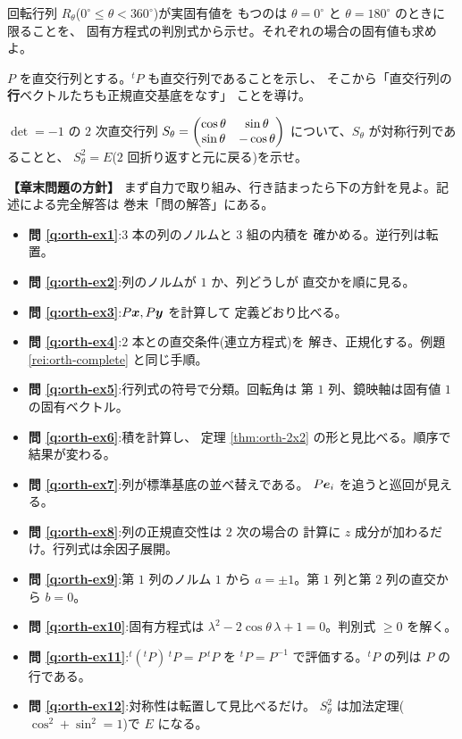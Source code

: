 \begin{mondai}[発展]\label{q:orth-ex10}
回転行列 $R_\theta$($0^\circ \le \theta < 360^\circ$)が実固有値を
もつのは $\theta = 0^\circ$ と $\theta = 180^\circ$ のときに限ることを、
固有方程式の判別式から示せ。それぞれの場合の固有値も求めよ。
\end{mondai}

\begin{mondai}[証明]\label{q:orth-ex11}
$P$ を直交行列とする。${}^t\!P$ も直交行列であることを示し、
そこから「直交行列の\textbf{行}ベクトルたちも正規直交基底をなす」
ことを導け。
\end{mondai}

\begin{mondai}[証明]\label{q:orth-ex12}
$\det = -1$ の $2$ 次直交行列
$S_\theta = \begin{pmatrix}\cos\theta & \sin\theta \\ \sin\theta & -\cos\theta\end{pmatrix}$
について、$S_\theta$ が対称行列であることと、
$S_\theta^2 = E$($2$ 回折り返すと元に戻る)を示せ。
\end{mondai}

\bigskip
{\small
\noindent\textbf{【章末問題の方針】}\quad
まず自力で取り組み、行き詰まったら下の方針を見よ。記述による完全解答は
巻末「問の解答」にある。
\begin{itemize}
\item \textbf{問 \ref{q:orth-ex1}}:$3$ 本の列のノルムと $3$ 組の内積を
確かめる。逆行列は転置。
\item \textbf{問 \ref{q:orth-ex2}}:列のノルムが $1$ か、列どうしが
直交かを順に見る。
\item \textbf{問 \ref{q:orth-ex3}}:$P\bm{x}, P\bm{y}$ を計算して
定義どおり比べる。
\item \textbf{問 \ref{q:orth-ex4}}:$2$ 本との直交条件(連立方程式)を
解き、正規化する。例題 \ref{rei:orth-complete} と同じ手順。
\item \textbf{問 \ref{q:orth-ex5}}:行列式の符号で分類。回転角は
第 $1$ 列、鏡映軸は固有値 $1$ の固有ベクトル。
\item \textbf{問 \ref{q:orth-ex6}}:積を計算し、
定理 \ref{thm:orth-2x2} の形と見比べる。順序で結果が変わる。
\item \textbf{問 \ref{q:orth-ex7}}:列が標準基底の並べ替えである。
$P\bm{e}_i$ を追うと巡回が見える。
\item \textbf{問 \ref{q:orth-ex8}}:列の正規直交性は $2$ 次の場合の
計算に $z$ 成分が加わるだけ。行列式は余因子展開。
\item \textbf{問 \ref{q:orth-ex9}}:第 $1$ 列のノルム $1$ から
$a = \pm 1$。第 $1$ 列と第 $2$ 列の直交から $b = 0$。
\item \textbf{問 \ref{q:orth-ex10}}:固有方程式は
$\lambda^2 - 2\cos\theta\,\lambda + 1 = 0$。判別式 $\ge 0$ を解く。
\item \textbf{問 \ref{q:orth-ex11}}:${}^t({}^t\!P)\,{}^t\!P = P\,{}^t\!P$
を ${}^t\!P = P^{-1}$ で評価する。${}^t\!P$ の列は $P$ の行である。
\item \textbf{問 \ref{q:orth-ex12}}:対称性は転置して見比べるだけ。
$S_\theta^2$ は加法定理($\cos^2 + \sin^2 = 1$)で $E$ になる。
\end{itemize}
}

